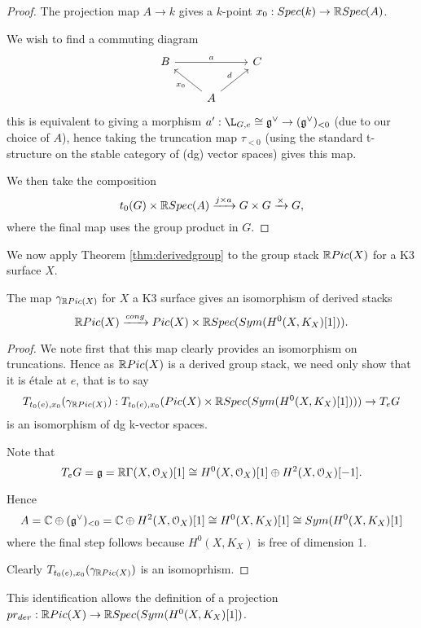 \begin{proof}
The projection map $A\rightarrow k$ gives a $k$-point $x_{0}:Spec(k)\rightarrow \mathbb R Spec(A)$.

We wish to find a commuting diagram 
\[
\begin{tikzcd}
B \arrow{rr}{a} && C\\
 & A \arrow{ur}{d} \arrow{ul}{x_{0}}
\end{tikzcd}
\]
this is equivalent to giving a morphism $a':\L_{G,e} \cong \mathfrak{g}^{\vee}\rightarrow (\mathfrak{g}^{\vee})_{<0}$ (due to our choice of $A$), hence taking the truncation map $\tau_{< 0}$ (using the standard t-structure on the stable category of (dg) vector spaces) gives 
this map.

We then take the composition
\[t_{0}(G)\times \mathbb R Spec(A)\xrightarrow{j\times a}G\times G\xrightarrow{\times}G,\]
where the final map uses the group product in $G$.
\end{proof}

We now apply Theorem \ref{thm:derivedgroup} to the group stack $\mathbb R Pic(X)$ for a K3 surface $X$.

\begin{thm}
The map $\gamma_{\mathbb R Pic(X)}$ for $X$ a K3 surface gives an isomorphism of derived stacks
\[\mathbb R Pic(X)\xrightarrow{cong} Pic(X)\times \mathbb R Spec(Sym(H^{0}(X,K_{X})[1])).\]
\end{thm}

\begin{proof}
We note first that this map clearly provides an isomorphism on truncations.  Hence as $\mathbb R Pic(X)$ is a derived group stack, we need only show that it is \'{e}tale at $e$, that is to say 
\[T_{t_{0}(e),x_{0}}(\gamma_{\mathbb R Pic(X)}):T_{t_{0}(e),x_{0}}(Pic(X)\times \mathbb R Spec(Sym(H^{0}(X,K_{X})[1])))\rightarrow T_{e}G\]
is an isomorphism of dg k-vector spaces.

Note that 
\[T_{e}G=\mathfrak{g}=\mathbb R \Gamma(X,\mathcal{O}_{X})[1]\cong H^{0}(X,\mathcal{O}_{X})[1]\oplus H^{2}(X,\mathcal{O}_{X})[-1].\] 

Hence 
\[A=\mathbb C\oplus (\mathfrak{g}^{\vee})_{<0}=\mathbb C\oplus H^{2}(X,\mathcal{O}_{X})[1]\cong H^{0}(X,K_{X})[1]\cong Sym(H^{0}(X,K_{X})[1]\]
where the final step follows because $H^{0}(X,K_{X})$ is free of dimension 1.

Clearly $T_{t_{0}(e),x_{0}}(\gamma_{\mathbb R Pic(X)})$ is an isomoprhism.
\end{proof}

This identification allows the definition of a projection $pr_{der}:\mathbb R Pic(X)\rightarrow \mathbb R Spec(Sym(H^{0}(X,K_{X})[1])$.

